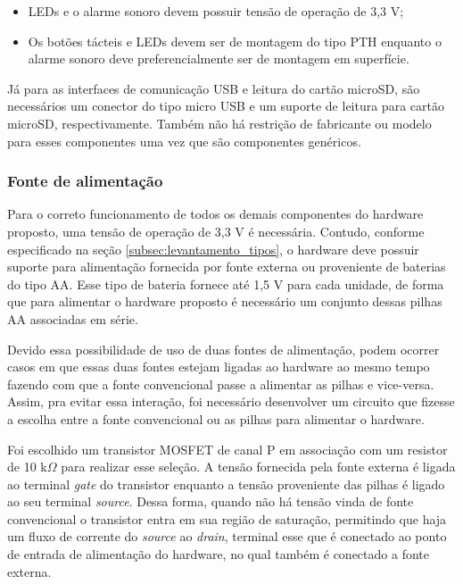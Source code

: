 \begin{itemize}
    \item LEDs e o alarme sonoro devem possuir tensão de operação de 3,3 V;
    \item Os botões tácteis e LEDs devem ser de montagem do tipo PTH enquanto o alarme sonoro deve preferencialmente ser de montagem em superfície.
\end{itemize}

Já para as interfaces de comunicação USB e leitura do cartão microSD, são necessários um conector do tipo micro USB e um suporte de leitura para cartão microSD, respectivamente. Também não há restrição de fabricante ou modelo para esses componentes uma vez que são componentes genéricos. 


\subsubsection{Fonte de alimentação}

Para o correto funcionamento de todos os demais componentes do hardware proposto, uma tensão de operação de 3,3 V é necessária. Contudo, conforme especificado na seção \ref{subsec:levantamento_tipos}, o hardware deve possuir suporte para alimentação fornecida por fonte externa ou proveniente de baterias do tipo AA. Esse tipo de bateria fornece até 1,5 V para cada unidade, de forma que para alimentar o hardware proposto é necessário um conjunto dessas pilhas AA associadas em série.

Devido essa possibilidade de uso de duas fontes de alimentação, podem ocorrer casos em que essas duas fontes estejam ligadas ao hardware ao mesmo tempo fazendo com que a fonte convencional passe a alimentar as pilhas e vice-versa. Assim, pra evitar essa interação, foi necessário desenvolver um circuito que fizesse a escolha entre a fonte convencional ou as pilhas para alimentar o hardware. 

Foi escolhido um transistor \gls{MOSFET} de canal P em associação com um resistor de 10 k$\Omega$ para realizar esse seleção. A tensão fornecida pela fonte externa é ligada ao terminal \textit{gate} do transistor enquanto a tensão proveniente das pilhas é ligado ao seu terminal \textit{source}. Dessa forma, quando não há tensão vinda de fonte convencional o transistor entra em sua região de saturação, permitindo que haja um fluxo de corrente do \textit{source} ao \textit{drain}, terminal esse que é conectado ao ponto de entrada de alimentação do hardware, no qual também é conectado a fonte externa. 

